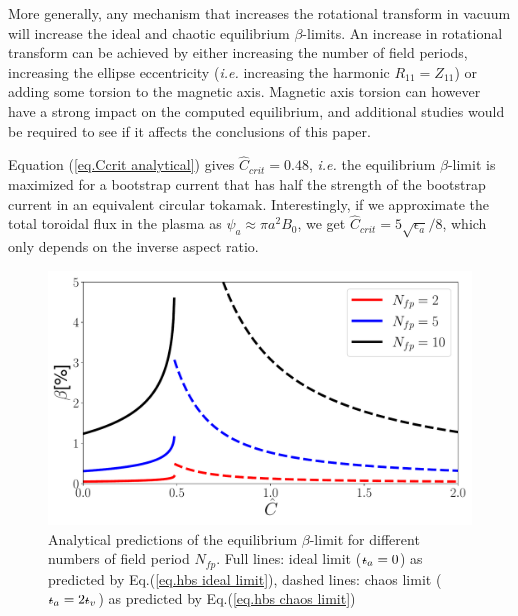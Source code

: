 \documentclass[my_thesis.tex]{subfiles}
\begin{document}
More generally, any mechanism that increases the rotational transform in vacuum will increase the ideal and chaotic equilibrium $\beta$-limits. An increase in rotational transform can be achieved by either increasing the number of field periods, increasing the ellipse eccentricity (\textit{i.e.} increasing the harmonic $R_{11}=Z_{11}$) or adding some torsion to the magnetic axis. Magnetic axis torsion can however have a strong impact on the computed equilibrium, and additional studies would be required to see if it affects the conclusions of this paper.

Equation (\ref{eq.Ccrit analytical}) gives $\hat{C}_{crit}=0.48$, \textit{i.e.} the equilibrium $\beta$-limit is maximized for a bootstrap current that has half the strength of the bootstrap current in an equivalent circular tokamak. Interestingly, if we approximate the total toroidal flux in the plasma as $\psi_a\approx\pi a^2 B_0$, we get $\hat{C}_{crit}=5\sqrt{\epsilon_a}/8$, which only depends on the inverse aspect ratio. 


\begin{figure}
	\centering
	\includegraphics[width=\linewidth]{images/ClassicalStellaratorBetaLimit/beta_limit_analytical_curves.pdf}
	\caption{Analytical predictions of the equilibrium $\beta$-limit for different numbers of field period $N_{fp}$. Full lines: ideal limit ($\text{$\iota\!\!$-}_a=0$) as predicted by Eq.(\ref{eq.hbs ideal limit}), dashed lines: chaos limit ($\text{$\iota\!\!$-}_a=2\text{$\iota\!\!$-}_v$) as predicted by Eq.(\ref{eq.hbs chaos limit})}
	\label{fig. analytical curves}
\end{figure}



\end{document}
